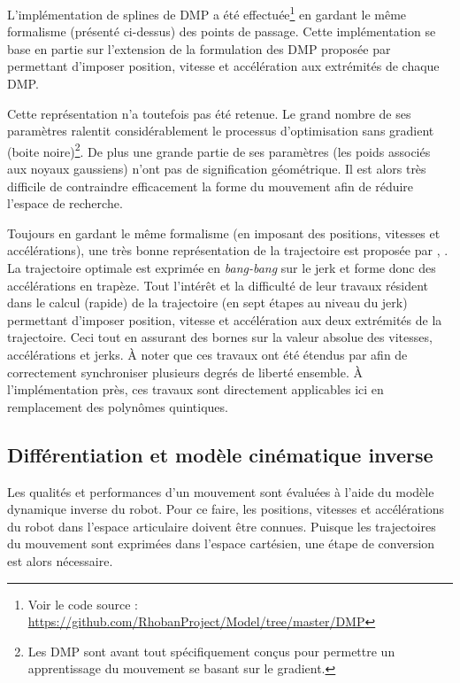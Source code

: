 L'implémentation de splines de DMP a été effectuée\footnote{Voir le code source : 
\url{https://github.com/RhobanProject/Model/tree/master/DMP}} en gardant le même
formalisme (présenté ci-dessus) des points de passage.
Cette implémentation se base en partie sur l'extension de la formulation
des DMP proposée par \cite{kober_movement_2010}
permettant d'imposer position, vitesse et accélération aux extrémités
de chaque DMP.

Cette représentation n'a toutefois pas été retenue.
Le grand nombre de ses paramètres ralentit considérablement le
processus d'optimisation sans gradient (boite noire)\footnote{Les DMP sont avant tout 
spécifiquement conçus pour permettre un apprentissage du mouvement 
se basant sur le gradient.}.
De plus une grande partie de ses paramètres (les poids associés aux noyaux gaussiens) 
n'ont pas de signification géométrique.
Il est alors très difficile de contraindre efficacement la forme du mouvement 
afin de réduire l'espace de recherche.

Toujours en gardant le même formalisme (en imposant des positions, 
vitesses et accélérations), une très bonne représentation de la trajectoire 
est proposée par \cite{broquere2008soft}, \cite{broquere2011planification}.
La trajectoire \og optimale \fg est exprimée en \textit{bang-bang} sur le jerk 
et forme donc des accélérations en trapèze.
Tout l'intérêt et la difficulté de leur travaux résident dans le calcul (rapide) 
de la trajectoire (en sept étapes au niveau du jerk) permettant d'imposer 
position, vitesse et accélération aux deux extrémités de la trajectoire.
Ceci tout en assurant des bornes sur la valeur absolue 
des vitesses, accélérations et jerks.
À noter que ces travaux ont été étendus par \cite{zhao2015trajectory} afin
de correctement synchroniser plusieurs degrés de liberté ensemble.
À l'implémentation près, ces travaux sont directement applicables ici
en remplacement des polynômes quintiques.

\subsection{Différentiation et modèle cinématique inverse}

Les qualités et performances d'un mouvement sont évaluées 
à l'aide du modèle dynamique inverse du robot.
Pour ce faire, les positions, vitesses et accélérations
du robot dans l'espace articulaire doivent être connues.
Puisque les trajectoires du mouvement sont exprimées
dans l'espace cartésien, une étape de conversion 
est alors nécessaire.\\

